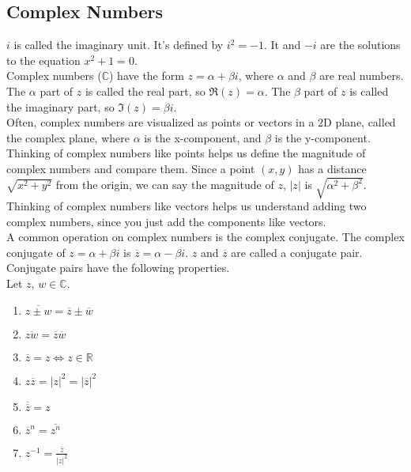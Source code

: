 \subsection{Complex Numbers}
\noindent
$i$ is called the imaginary unit. It's defined by $i^2 = -1$. It and $-i$ are the solutions to the equation $x^2+1=0$.\\

\noindent
Complex numbers ($\mathbb{C}$) have the form $z = \alpha + \beta i$, where $\alpha$ and $\beta$ are real numbers. The $\alpha$ part of $z$ is called the real part, so $\Re(z) = \alpha$. The $\beta$ part of $z$ is called the imaginary part, so $\Im(z) = \beta i$.\\

\noindent
Often, complex numbers are visualized as points or vectors in a 2D plane, called the complex plane, where $\alpha$ is the x-component, and $\beta$ is the y-component. Thinking of complex numbers like points helps us define the magnitude of complex numbers and compare them. Since a point $(x,y)$ has a distance $\sqrt{x^2+y^2}$ from the origin, we can say the magnitude of $z$, $\lvert z \rvert$ is $\sqrt{\alpha^2 + \beta^2}$. Thinking of complex numbers like vectors helps us understand adding two complex numbers, since you just add the components like vectors.\\

\noindent
A common operation on complex numbers is the complex conjugate. The complex conjugate of $z = \alpha + \beta i$ is $\overline{z} = \alpha - \beta i$. $z$ and $\overline{z}$ are called a conjugate pair.\\

\noindent
Conjugate pairs have the following properties.
\\Let $z$, $w \in \mathbb{C}$.
\begin{enumerate}[label=]
	\item $\overline{z \pm w} = \overline{z} \pm \overline{w}$
	\item $\overline{zw}=\overline{z}\overline{w}$
	\item $\overline{z}=z \Leftrightarrow z \in \mathbb{R}$
	\item $z\overline{z} = \lvert z \rvert^2 = \lvert \overline{z} \rvert^2$
	\item $\overline{\overline{z}} = z$
	\item $\overline{z}^n = \overline{z^n}$
	\item $z^{-1} = \frac{\overline{z}}{\lvert z \rvert^2}$
\end{enumerate}